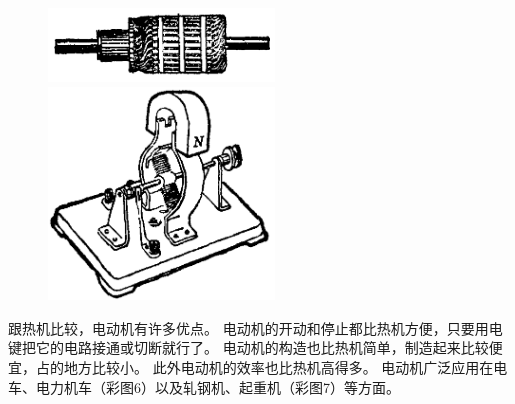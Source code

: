 \begin{figure}[htbp]
    \centering
    \begin{minipage}{7cm}
    \centering
    \vspace{3cm}
    \includegraphics[width=6cm]{../pic/czwl2-ch10-42}
    \caption{}\label{fig:10-42}
    \end{minipage}
    \qquad
    \begin{minipage}{7cm}
    \centering
    \includegraphics[width=6cm]{../pic/czwl2-ch10-43}
    \caption{}\label{fig:10-43}
    \end{minipage}
\end{figure}

跟热机比较，电动机有许多优点。
电动机的开动和停止都比热机方便，只要用电键把它的电路接通或切断就行了。
电动机的构造也比热机简单，制造起来比较便宜，占的地方比较小。
此外电动机的效率也比热机高得多。
电动机广泛应用在电车、电力机车（彩图6）以及轧钢机、起重机（彩图7）等方面。
